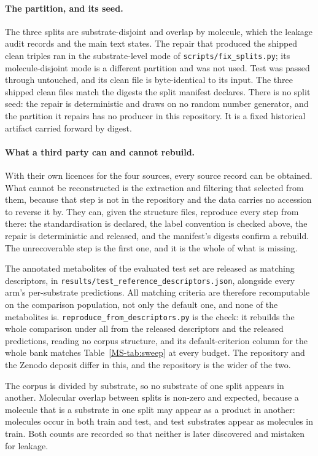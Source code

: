 \documentclass[journal=jcisd8,manuscript=suppinfo,layout=onecolumn]{achemso}
\begin{document}
\paragraph{The partition, and its seed.} The three splits are substrate-disjoint and overlap by
molecule, which the leakage audit records and the main text states. The repair that
produced the shipped clean triples ran in the substrate-level mode of
\texttt{scripts/fix\_splits.py}; its molecule-disjoint mode is a different partition and was not
used. Test was passed through untouched, and its clean file is byte-identical to its input. The
three shipped clean files match the digests the split manifest declares. There is no split seed:
the repair is deterministic and draws on no random number generator, and the partition it repairs
has no producer in this repository. It is a fixed historical artifact carried forward by digest.

\paragraph{What a third party can and cannot rebuild.} With their own licences for the four
sources, every source record can be obtained. What cannot be reconstructed is the extraction and
filtering that selected from them, because that step is not in the repository and the data
carries no accession to reverse it by. They can, given the structure files, reproduce every step
from there: the standardisation is declared, the label convention is checked above, the repair is
deterministic and released, and the manifest's digests confirm a rebuild. The unrecoverable step is
the first one, and it is the whole of what is
missing.

The annotated metabolites of the evaluated test set are released as matching descriptors, in
\texttt{results/test\_reference\_descriptors.json}, alongside every arm's per-substrate
predictions. All \numCritCriteria{} matching criteria are therefore recomputable on the comparison
population, not only the default one, and none of the metabolites is.
\texttt{reproduce\_from\_descriptors.py} is the check: it rebuilds the whole comparison under all
\numCritCriteria{} from the released descriptors and the released predictions, reading no corpus
structure, and its default-criterion column for the whole bank matches Table~\ref{MS-tab:sweep} at
every budget. The repository and the Zenodo deposit differ in this, and the repository is the wider
of the two.

The corpus is divided by substrate, so no substrate of one split appears in another. Molecular
overlap between splits is non-zero and expected, because a molecule
that is a substrate in one split may appear as a product in another: \numLeakMolOverlap{}
molecules occur in both train and test, and \numLeakSubAsMol{} test substrates appear as molecules
in train. Both counts are recorded so that neither is later discovered and mistaken for leakage.
\end{document}
